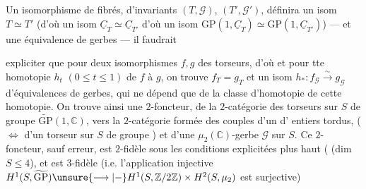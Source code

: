 Un isomorphisme de fibrés, d'invariants
$(T,\mathcal G)$, $(T',\mathcal G')$, définira un isom $T\simeq T'$
(d'où un isom 
$\underline C_T\simeq\underline C_{T'}$ d'où
un isom $\mathrm{GP}(1,\underline C_T)\simeq\mathrm{GP}(1,\underline C_{T'})$) --- et
une équivalence de gerbes --- il faudrait

expliciter que pour deux isomorphismes
$f,g$ des torseurs,  d'où
et pour tte homotopie $h_t$ $(0\leq t\leq1)$ de
$f$ à $g$, on trouve $f_T=g_T$ et un
isom $h_*:f_{\mathcal G}\xrightarrow{\sim}g_{\mathcal G}$ d'équivalences de
gerbes, qui ne dépend que de la classe
d'homotopie de cette homotopie. On
trouve ainsi une $2$-foncteur, de la
$2$-catégorie des  torseurs sur $S$
de groupe $\widetilde{\mathrm{GP}}(1,\mathbb C)$, vers la $2$-catégorie
formée des couples  d'un
  d'%
entiers tordus,  ($\Longleftrightarrow$ d'un torseur sur
$S$ de groupe  ) et d'une
 $\mu_2(\mathbb C)$-gerbe $\mathcal G$ sur $S$. Ce
$2$-foncteur, sauf erreur, est $2$-fidèle
sous les conditions explicitées plus
haut ( (dim $S\leq4$), et
est $3$-fidèle (i.e. l'application injective
$H^1(S,\widetilde{\mathrm{GP}})\unsure{\longrightarrow|{-}}
H^1(S,\mathbb Z/2\mathbb Z)\times H^2(S,\mu_2)$ est surjective)


